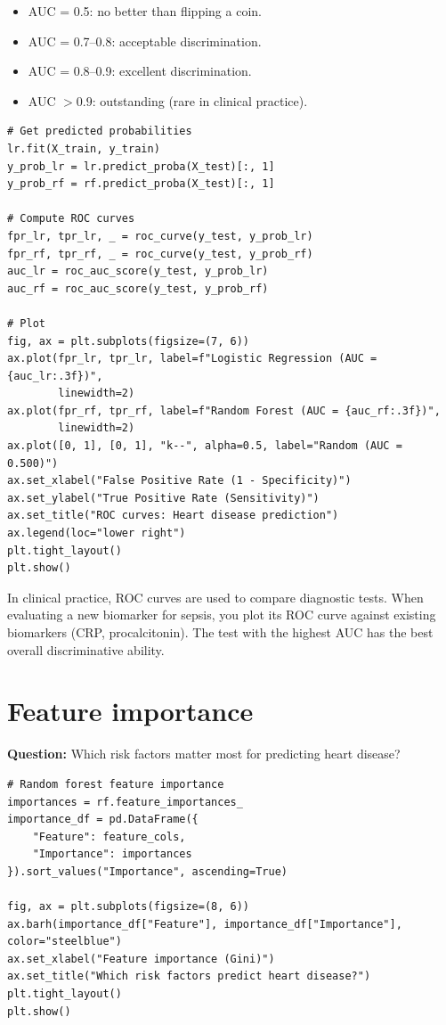 \begin{itemize}
  \item AUC = 0.5: no better than flipping a coin.
  \item AUC = 0.7--0.8: acceptable discrimination.
  \item AUC = 0.8--0.9: excellent discrimination.
  \item AUC $> 0.9$: outstanding (rare in clinical practice).
\end{itemize}

\begin{verbatim}
# Get predicted probabilities
lr.fit(X_train, y_train)
y_prob_lr = lr.predict_proba(X_test)[:, 1]
y_prob_rf = rf.predict_proba(X_test)[:, 1]

# Compute ROC curves
fpr_lr, tpr_lr, _ = roc_curve(y_test, y_prob_lr)
fpr_rf, tpr_rf, _ = roc_curve(y_test, y_prob_rf)
auc_lr = roc_auc_score(y_test, y_prob_lr)
auc_rf = roc_auc_score(y_test, y_prob_rf)

# Plot
fig, ax = plt.subplots(figsize=(7, 6))
ax.plot(fpr_lr, tpr_lr, label=f"Logistic Regression (AUC = {auc_lr:.3f})",
        linewidth=2)
ax.plot(fpr_rf, tpr_rf, label=f"Random Forest (AUC = {auc_rf:.3f})",
        linewidth=2)
ax.plot([0, 1], [0, 1], "k--", alpha=0.5, label="Random (AUC = 0.500)")
ax.set_xlabel("False Positive Rate (1 - Specificity)")
ax.set_ylabel("True Positive Rate (Sensitivity)")
ax.set_title("ROC curves: Heart disease prediction")
ax.legend(loc="lower right")
plt.tight_layout()
plt.show()
\end{verbatim}

\begin{clinicalnote}
In clinical practice, ROC curves are used to compare diagnostic tests. When evaluating a new biomarker for sepsis, you plot its ROC curve against existing biomarkers (CRP, procalcitonin). The test with the highest AUC has the best overall discriminative ability.
\end{clinicalnote}

\section{Feature importance}

\textbf{Question:} Which risk factors matter most for predicting heart disease?

\begin{verbatim}
# Random forest feature importance
importances = rf.feature_importances_
importance_df = pd.DataFrame({
    "Feature": feature_cols,
    "Importance": importances
}).sort_values("Importance", ascending=True)

fig, ax = plt.subplots(figsize=(8, 6))
ax.barh(importance_df["Feature"], importance_df["Importance"], color="steelblue")
ax.set_xlabel("Feature importance (Gini)")
ax.set_title("Which risk factors predict heart disease?")
plt.tight_layout()
plt.show()
\end{verbatim}

